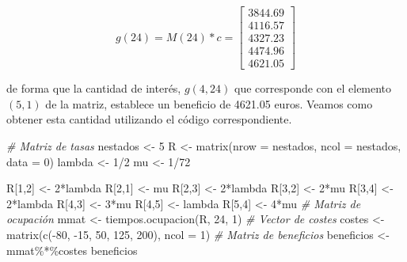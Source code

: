 \documentclass[
]{book}
\newenvironment{Shaded}{\begin{snugshade}}{\end{snugshade}}
\newcommand{\AttributeTok}[1]{\textcolor[rgb]{0.77,0.63,0.00}{#1}}
\newcommand{\CommentTok}[1]{\textcolor[rgb]{0.56,0.35,0.01}{\textit{#1}}}
\newcommand{\DecValTok}[1]{\textcolor[rgb]{0.00,0.00,0.81}{#1}}
\newcommand{\FunctionTok}[1]{\textcolor[rgb]{0.00,0.00,0.00}{#1}}
\newcommand{\NormalTok}[1]{#1}
\newcommand{\OtherTok}[1]{\textcolor[rgb]{0.56,0.35,0.01}{#1}}
\newcommand{\SpecialCharTok}[1]{\textcolor[rgb]{0.00,0.00,0.00}{#1}}
\theoremstyle{definition}
\theoremstyle{definition}
\theoremstyle{definition}
\theoremstyle{definition}
\theoremstyle{remark}
\begin{document}
\[
g(24) = M(24)*c =
\begin{bmatrix}
3844.69 \\
4116.57 \\
4327.23 \\
4474.96 \\
4621.05
\end{bmatrix}
\]

de forma que la cantidad de interés, \(g(4, 24)\) que corresponde con el elemento \((5,1)\) de la matriz, establece un beneficio de 4621.05 euros. Veamos como obtener esta cantidad utilizando el código correspondiente.

\begin{Shaded}
\begin{Highlighting}[]
\CommentTok{\# Matriz de tasas}
\NormalTok{nestados }\OtherTok{\textless{}{-}} \DecValTok{5}
\NormalTok{R }\OtherTok{\textless{}{-}} \FunctionTok{matrix}\NormalTok{(}\AttributeTok{nrow =}\NormalTok{ nestados, }\AttributeTok{ncol =}\NormalTok{ nestados, }\AttributeTok{data =} \DecValTok{0}\NormalTok{)}
\NormalTok{lambda }\OtherTok{\textless{}{-}} \DecValTok{1}\SpecialCharTok{/}\DecValTok{2}
\NormalTok{mu }\OtherTok{\textless{}{-}} \DecValTok{1}\SpecialCharTok{/}\DecValTok{72} 

\NormalTok{R[}\DecValTok{1}\NormalTok{,}\DecValTok{2}\NormalTok{] }\OtherTok{\textless{}{-}} \DecValTok{2}\SpecialCharTok{*}\NormalTok{lambda }
\NormalTok{R[}\DecValTok{2}\NormalTok{,}\DecValTok{1}\NormalTok{] }\OtherTok{\textless{}{-}}\NormalTok{ mu }
\NormalTok{R[}\DecValTok{2}\NormalTok{,}\DecValTok{3}\NormalTok{] }\OtherTok{\textless{}{-}} \DecValTok{2}\SpecialCharTok{*}\NormalTok{lambda }
\NormalTok{R[}\DecValTok{3}\NormalTok{,}\DecValTok{2}\NormalTok{] }\OtherTok{\textless{}{-}} \DecValTok{2}\SpecialCharTok{*}\NormalTok{mu }
\NormalTok{R[}\DecValTok{3}\NormalTok{,}\DecValTok{4}\NormalTok{] }\OtherTok{\textless{}{-}} \DecValTok{2}\SpecialCharTok{*}\NormalTok{lambda }
\NormalTok{R[}\DecValTok{4}\NormalTok{,}\DecValTok{3}\NormalTok{] }\OtherTok{\textless{}{-}} \DecValTok{3}\SpecialCharTok{*}\NormalTok{mu }
\NormalTok{R[}\DecValTok{4}\NormalTok{,}\DecValTok{5}\NormalTok{] }\OtherTok{\textless{}{-}}\NormalTok{ lambda}
\NormalTok{R[}\DecValTok{5}\NormalTok{,}\DecValTok{4}\NormalTok{] }\OtherTok{\textless{}{-}} \DecValTok{4}\SpecialCharTok{*}\NormalTok{mu}
\CommentTok{\# Matriz de ocupación}
\NormalTok{mmat }\OtherTok{\textless{}{-}} \FunctionTok{tiempos.ocupacion}\NormalTok{(R, }\DecValTok{24}\NormalTok{, }\DecValTok{1}\NormalTok{)}
\CommentTok{\# Vector de costes}
\NormalTok{costes }\OtherTok{\textless{}{-}} \FunctionTok{matrix}\NormalTok{(}\FunctionTok{c}\NormalTok{(}\SpecialCharTok{{-}}\DecValTok{80}\NormalTok{, }\SpecialCharTok{{-}}\DecValTok{15}\NormalTok{, }\DecValTok{50}\NormalTok{, }\DecValTok{125}\NormalTok{, }\DecValTok{200}\NormalTok{), }\AttributeTok{ncol =} \DecValTok{1}\NormalTok{)}
\CommentTok{\# Matriz de beneficios}
\NormalTok{beneficios }\OtherTok{\textless{}{-}}\NormalTok{ mmat}\SpecialCharTok{\%*\%}\NormalTok{costes}
\NormalTok{beneficios}
\end{Highlighting}
\end{Shaded}
\end{document}
